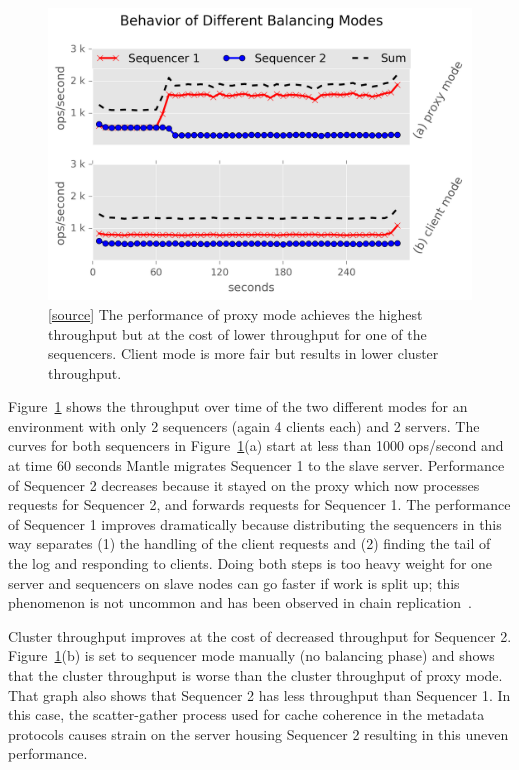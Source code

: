 \begin{figure}[t!]
\centering
\includegraphics{figures/mantle-mode-behavior.png}
\caption{
[\href{https://github.com/michaelsevilla/malacology-popper/blob/v2.1/experiments/mds-zlog-seq-migrate-redux-waves/results-paper/visualize.ipynb}{source}]
The performance of proxy mode achieves the highest throughput but at the cost
of lower throughput for one of the sequencers. Client mode is more fair but
results in lower cluster throughput.  }\label{fig:mantle-mode-behavior}
\end{figure}

Figure~\ref{fig:mantle-mode-behavior} shows the throughput over time of the two
different modes for an environment with only 2 sequencers (again 4 clients
each) and 2 servers. The curves for both sequencers in
Figure~\ref{fig:mantle-mode-behavior}(a) start at less than 1000 ops/second and
at time 60 seconds Mantle migrates Sequencer 1 to the slave server.
Performance of Sequencer 2 decreases because it stayed on the proxy which now
processes requests for Sequencer 2, and forwards
requests for Sequencer 1. The performance of Sequencer 1 improves dramatically
because distributing the sequencers in this way separates (1) the handling of
the client requests and (2) finding the tail of the log and responding to
clients.  Doing both steps is too heavy weight for one server and sequencers on
slave nodes can go faster if work is split up; this phenomenon is not uncommon
and has been observed in chain replication~\cite{chain_rep}.

Cluster throughput improves at the cost of decreased throughput for Sequencer
2.  Figure~\ref{fig:mantle-mode-behavior}(b) is set to sequencer mode manually
(no balancing phase) and shows that the cluster throughput is worse than the
cluster throughput of proxy mode. That graph also shows that Sequencer 2 has
less throughput than Sequencer 1. In this case, the scatter-gather process used
for cache coherence in the metadata protocols causes strain on the server
housing Sequencer 2 resulting in this uneven performance. 

